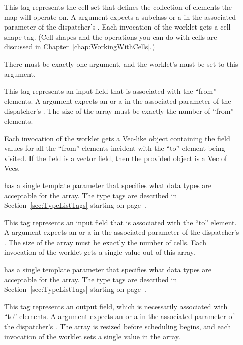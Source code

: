 \begin{description}
\item[] This tag represents the cell set that defines
  the collection of elements the map will operate on. A 
  argument expects a  subclass or a
   in the associated parameter of the
  dispatcher's . Each invocation of the worklet gets a
  cell shape tag. (Cell shapes and the operations you can do with cells are
  discussed in Chapter~\ref{chap:WorkingWithCells}.)

  There must be exactly one  argument, and the worklet's
   must be set to this argument.

\item[] This tag represents an input field that is
  associated with the ``from'' elements. A  argument
  expects an  or a
   in the associated parameter of the
  dispatcher's . The size of the array must be exactly the
  number of ``from'' elements.

  Each invocation of the worklet gets a Vec-like object containing the
  field values for all the ``from'' elements incident with the ``to''
  element being visited. If the field is a vector field, then the provided
  object is a Vec of Vecs.

   has a single template parameter that specifies what
  data types are acceptable for the array. The type tags are described in
  Section~\ref{sec:TypeListTags} starting on page~\pageref{TypeTagList}.

\item[] This tag represents an input field that is
  associated with the ``to'' element. A  argument expects
  an  or a 
  in the associated parameter of the dispatcher's . The
  size of the array must be exactly the number of cells. Each invocation of
  the worklet gets a single value out of this array.

   has a single template parameter that specifies what
  data types are acceptable for the array. The type tags are described in
  Section~\ref{sec:TypeListTags} starting on page~\pageref{TypeTagList}.

\item[] This tag represents an output field, which is
  necessarily associated with ``to'' elements. A  argument
  expects an  or a
   in the associated parameter of the
  dispatcher's . The array is resized before scheduling
  begins, and each invocation of the worklet sets a single value in the
  array.


\end{description}
